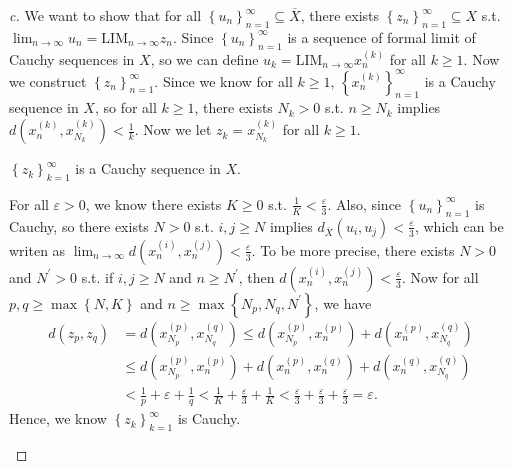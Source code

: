 \begin{proof}[c]
  We want to show that for all \(\left\{ u_n \right\}_{n=1}^{\infty}  \subseteq \overline{X}  \), there exists \(\left\{ z_n \right\}_{n=1}^{\infty} \subseteq X \) s.t. \(\lim_{n \to \infty} u_n = \mathrm{LIM}_{n \to \infty } z_n \). Since \(\left\{ u_n \right\}_{n=1}^{\infty } \) is a sequence of formal limit of Cauchy sequences in \(X\), so we can define \(u_k = \mathrm{LIM}_{n \to \infty } x_n^{(k)} \) for all \(k \ge 1\). Now we construct \(\left\{ z_n \right\}_{n=1}^{\infty}  \). Since we know for all \(k \ge 1\), \(\left\{ x^{(k)}_n \right\}_{n=1}^{\infty}  \) is a Cauchy sequence in \(X\), so for all \(k \ge 1\), there exists \(N_k > 0\) s.t. \(n \ge N_k\) implies \(d\left( x_n^{(k)}, x_{N_k}^{(k)} \right) < \frac{1}{k} \). Now we let \(z_k = x_{N_k}^{(k)}\) for all \(k \ge 1\). 
  \begin{claim} \label{clm: zk Cauchy}
    \(\left\{ z_k \right\}_{k=1}^{\infty}  \) is a Cauchy sequence in \(X\).  
  \end{claim} 
  \begin{explanation}
    For all \(\varepsilon > 0\), we know there exists \(K \ge 0\) s.t. \(\frac{1}{K} < \frac{\varepsilon}{3}\). Also, since \(\left\{ u_n \right\}_{n=1}^{\infty}  \) is Cauchy, so there exists \(N > 0\) s.t. \(i, j \ge N\) implies \(d_{\overline{X} }(u_i, u_j) < \frac{\varepsilon}{3} \), which can be writen as \(\lim_{n \to \infty} d\left( x_n^{(i)}, x_n^{(j)} \right) < \frac{\varepsilon}{3}  \). To be more precise, there exists \(N > 0\) and \(N^{\prime}  > 0\) s.t. if \(i, j \ge N\) and \(n \ge N^{\prime} \), then \(d\left( x_n^{(i)}, x_n^{(j)} \right) < \frac{\varepsilon}{3} \). Now for all \(p, q \ge \max \left\{ N, K \right\} \) and \(n \ge \max \left\{ N_p, N_q, N^{\prime}  \right\} \), we have 
    \begin{align*}
       d(z_p, z_q ) &= d\left( x_{N_p}^{(p)}, x_{N_q}^{(q)} \right) \le d\left( x_{N_p}^{(p)}, x_n^{(p)} \right) + d\left( x_n^{(p)}, x_{N_q}^{(q)} \right) \\
       &\le d\left( x_{N_p}^{(p)}, x_n^{(p)} \right) + d\left( x_n^{(p)}, x_n^{(q)} \right) + d\left( x_n^{(q)}, x_{N_q}^{(q)} \right) \\
       &< \frac{1}{p} + \varepsilon + \frac{1}{q} < \frac{1}{K} + \frac{\varepsilon}{3} + \frac{1}{K} < \frac{\varepsilon}{3} + \frac{\varepsilon}{3} + \frac{\varepsilon}{3} = \varepsilon.  
    \end{align*}    
    Hence, we know \(\left\{ z_k \right\}_{k=1}^{\infty}  \) is Cauchy.           
  \end{explanation}


\end{proof}
